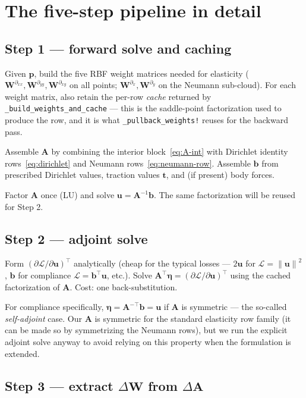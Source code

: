 \documentclass[11pt,a4paper]{article}
\newcommand{\mat}[1]{\mathbf{#1}}
\newcommand{\vect}[1]{\boldsymbol{#1}}
\newcommand{\pts}{\vect{p}}
\newcommand{\norm}[1]{\left\lVert#1\right\rVert}
\newcommand{\Loss}{\mathcal{L}}
\begin{document}
\section{The five-step pipeline in detail}
\label{sec:five-steps}

\subsection{Step 1 --- forward solve and caching}

Given $\pts$, build the five RBF weight matrices needed for elasticity
($\mat W^{\partial_{xx}}, \mat W^{\partial_{yy}},
\mat W^{\partial_{xy}}$ on all points; $\mat W^{\partial_x},
\mat W^{\partial_y}$ on the Neumann sub-cloud). For each weight
matrix, also retain the per-row \emph{cache} returned by
\texttt{\_build\_weights\_and\_cache} ---
this is the saddle-point factorization used to produce the row, and
it is what \texttt{\_pullback\_weights!} reuses for the backward pass.

Assemble $\mat A$ by combining the interior block~\eqref{eq:A-int}
with Dirichlet identity rows~\eqref{eq:dirichlet} and Neumann
rows~\eqref{eq:neumann-row}. Assemble $\vect b$ from prescribed
Dirichlet values, traction values $\vect t$, and (if present) body
forces.

Factor $\mat A$ once (LU) and solve $\vect u = \mat A^{-1}\vect b$.
The same factorization will be reused for Step 2.

\subsection{Step 2 --- adjoint solve}

Form $(\partial\Loss/\partial\vect u)^\top$ analytically (cheap for
the typical losses --- $2\vect u$ for $\Loss = \norm{\vect u}^2$,
$\vect b$ for compliance $\Loss = \vect b^\top \vect u$, etc.). Solve
$\mat A^\top \vect\eta = (\partial\Loss/\partial\vect u)^\top$ using
the cached factorization of $\mat A$. Cost: one back-substitution.

For compliance specifically, $\vect\eta = \mat A^{-\top} \vect b
= \vect u$ if $\mat A$ is symmetric --- the so-called
\emph{self-adjoint} case. Our $\mat A$ is symmetric for the standard
elasticity row family (it can be made so by symmetrizing the
Neumann rows), but we run the explicit adjoint solve anyway to
avoid relying on this property when the formulation is extended.

\subsection{Step 3 --- extract \texorpdfstring{$\Delta\mat W$ from $\Delta\mat A$}{Delta W from Delta A}}
\label{sec:step3}
\end{document}
